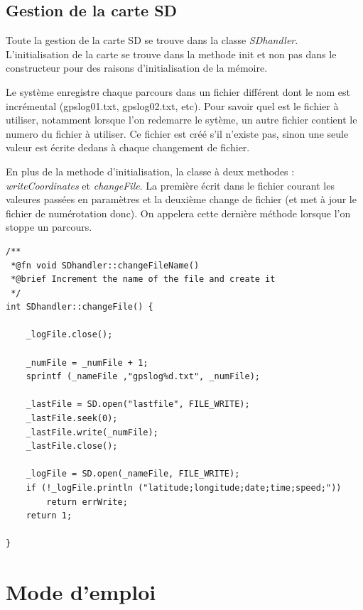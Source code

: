 \documentclass[a4paper,12pt,titlepage]{article}
\begin{document}
\subsection{Gestion de la carte SD}

Toute la gestion de la carte SD se trouve dans la classe \emph{SDhandler}.
L'initialisation de la carte se trouve dans la methode init et non pas dans le constructeur pour des raisons d'initialisation de la mémoire.

Le système enregistre chaque parcours dans un fichier différent dont le nom est incrémental (gpslog01.txt, gpslog02.txt, etc). 
Pour savoir quel est le fichier à utiliser, notamment lorsque l'on redemarre le sytème, un autre fichier contient le numero du fichier à utiliser.
Ce fichier est créé s'il n'existe pas, sinon une seule valeur est écrite dedans à chaque changement de fichier.

En plus de la methode d'initialisation, la classe à deux methodes : \emph{writeCoordinates} et \emph{changeFile}.
La première écrit dans le fichier courant les valeures passées en paramètres et la deuxième change de fichier (et met à jour le fichier de numérotation donc).
On appelera cette dernière méthode lorsque l'on stoppe un parcours.


\begin{lstlisting}[caption={changeFile}, label={changeFile}]
/**
 *@fn void SDhandler::changeFileName()
 *@brief Increment the name of the file and create it
 */
int SDhandler::changeFile() {

    _logFile.close();

    _numFile = _numFile + 1;
    sprintf (_nameFile ,"gpslog%d.txt", _numFile);

    _lastFile = SD.open("lastfile", FILE_WRITE);
    _lastFile.seek(0);
    _lastFile.write(_numFile);
    _lastFile.close();

    _logFile = SD.open(_nameFile, FILE_WRITE);
    if (!_logFile.println ("latitude;longitude;date;time;speed;"))
        return errWrite;
    return 1;

}
\end{lstlisting}

\section{Mode d'emploi}
\end{document}
